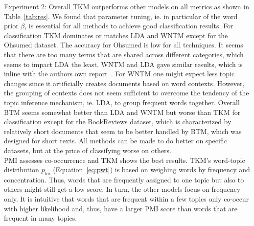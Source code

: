 \documentclass[twocolumn,10]{article}
\newcommand{\ci}{~\cite} \newcommand{\re}{~\ref} \newcommand{\ma}{\mathbb}
\begin{document}
	\noindent\underline{Experiment 2:}  %
	Overall TKM outperforms other models on all metrics as shown in Table\re{tab:res}. We found that parameter tuning, ie. in particular of the word prior $\beta$, is essential for all methods to achieve good classification results. For classification TKM dominates or matches LDA and WNTM except for the Ohsumed dataset. The accuracy for Ohsumed is low for all techniques. It seems that there are too many terms that are shared across different categories, which seems to impact LDA the least. WNTM and LDA gave similar results, which is inline with the authors own report\ci{zuo16}. For WNTM one might expect less topic changes since it artificially creates documents based on word contexts. However, the grouping of contexts does not seem sufficient to overcome the tendency of the topic inference mechanism, ie. LDA, to group frequent words together. Overall BTM seems somewhat better than LDA and WNTM but worse than TKM for classification except for the BookReviews dataset, which is characterized by relatively short documents that seem to be better handled by BTM, which was designed for short texts. All methods can be made to do better on specific datasets, but at the price of classifying worse on others.\\ 
	PMI assesses co-occurrence and TKM shows the best results. TKM's word-topic distribution $p_{hu}$ (Equation\re{eq:pwt}) is based on weighing words by frequency and concentration. Thus, words that are frequently assigned to one topic but also to others might still get a low score. In turn, the other models focus on frequency only. It is intuitive that words that are frequent within a few topics only co-occur with higher likelihood and, thus, have a larger PMI score than words that are frequent in many topics.\\ 
\end{document}
